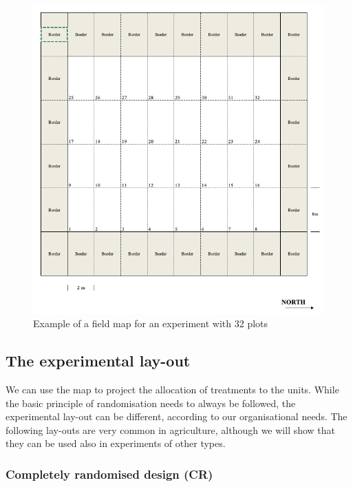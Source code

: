 \documentclass[a4paper,12pt,oneside]{book}
\begin{document}
\begin{figure}

{\centering \includegraphics[width=0.9\linewidth]{_images/Mappa1} 

}

\caption{Example of a field map for an experiment with 32 plots}\label{fig:figName31}
\end{figure}

\hypertarget{the-experimental-lay-out}{%
\subsection{The experimental lay-out}\label{the-experimental-lay-out}}

We can use the map to project the allocation of treatments to the units. While the basic principle of randomisation needs to always be followed, the experimental lay-out can be different, according to our organisational needs. The following lay-outs are very common in agriculture, although we will show that they can be used also in experiments of other types.

\hypertarget{completely-randomised-design-cr}{%
\subsubsection{Completely randomised design (CR)}\label{completely-randomised-design-cr}}
\end{document}
